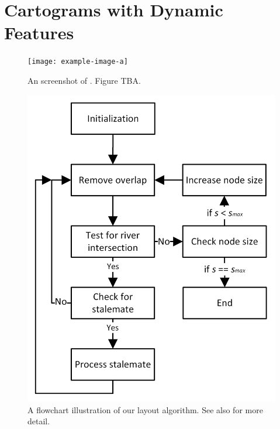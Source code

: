 \section{Cartograms with Dynamic Features}

{
\begin{figure}[tb!]
    \centering
    \texttt{[image: example-image-a]}
    \caption{An screenshot of \software. Figure TBA.}
    \label{fig:overview}
\end{figure}
}

{
    \begin{figure}[tb!]
        \centering
        \includegraphics[width=\columnwidth]{figure/flowchart.png}
        \caption{A flowchart illustration of our layout algorithm. See also  for more detail.}
        \label{fig:flowchart}
    \end{figure}
}

